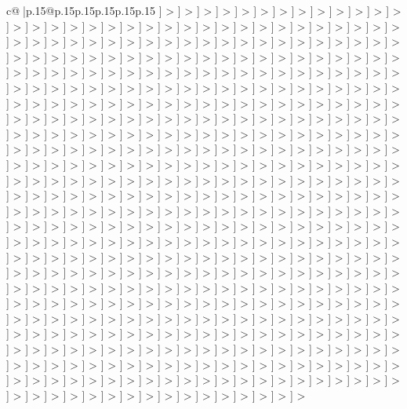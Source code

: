 \documentclass{article}
\begin{document}
{\begin{supertabular}{c@{$\;$}|p{.15\linewidth}@{}p{.15\linewidth}p{.15\linewidth}p{.15\linewidth}p{.15\linewidth}p{.15\linewidth}}
{{{{]} > {]} > {]} > {]} > {]} > {]} > {]} > {]} > {]} > {]} > {]} > {]} > {]} > {]} > {]} > {]} > {]} > {]} > {]} > {]} > {]} > {]} > {]} > {]} > {]} > {]} > {]} > {]} > {]} > {]} > {]} > {]} > {]} > {]} > {]} > {]} > {]} > {]} > {]} > {]} > {]} > {]} > {]} > {]} > {]} > {]} > {]} > {]} > {]} > {]} > {]} > {]} > {]} > {]} > {]} > {]} > {]} > {]} > {]} > {]} > {]} > {]} > {]} > {]} > {]} > {]} > {]} > {]} > {]} > {]} > {]} > {]} > {]} > {]} > {]} > {]} > {]} > {]} > {]} > {]} > {]} > {]} > {]} > {]} > {]} > {]} > {]} > {]} > {]} > {]} > {]} > {]} > {]} > {]} > {]} > {]} > {]} > {]} > {]} > {]} > {]} > {]} > {]} > {]} > {]} > {]} > {]} > {]} > {]} > {]} > {]} > {]} > {]} > {]} > {]} > {]} > {]} > {]} > {]} > {]} > {]} > {]} > {]} > {]} > {]} > {]} > {]} > {]} > {]} > {]} > {]} > {]} > {]} > {]} > {]} > {]} > {]} > {]} > {]} > {]} > {]} > {]} > {]} > {]} > {]} > {]} > {]} > {]} > {]} > {]} > {]} > {]} > {]} > {]} > {]} > {]} > {]} > {]} > {]} > {]} > {]} > {]} > {]} > {]} > {]} > {]} > {]} > {]} > {]} > {]} > {]} > {]} > {]} > {]} > {]} > {]} > {]} > {]} > {]} > {]} > {]} > {]} > {]} > {]} > {]} > {]} > {]} > {]} > {]} > {]} > {]} > {]} > {]} > {]} > {]} > {]} > {]} > {]} > {]} > {]} > {]} > {]} > {]} > {]} > {]} > {]} > {]} > {]} > {]} > {]} > {]} > {]} > {]} > {]} > {]} > {]} > {]} > {]} > {]} > {]} > {]} > {]} > {]} > {]} > {]} > {]} > {]} > {]} > {]} > {]} > {]} > {]} > {]} > {]} > {]} > {]} > {]} > {]} > {]} > {]} > {]} > {]} > {]} > {]} > {]} > {]} > {]} > {]} > {]} > {]} > {]} > {]} > {]} > {]} > {]} > {]} > {]} > {]} > {]} > {]} > {]} > {]} > {]} > {]} > {]} > {]} > {]} > {]} > {]} > {]} > {]} > {]} > {]} > {]} > {]} > {]} > {]} > {]} > {]} > {]} > {]} > {]} > {]} > {]} > {]} > {]} > {]} > {]} > {]} > {]} > {]} > {]} > {]} > {]} > {]} > {]} > {]} > {]} > {]} > {]} > {]} > {]} > {]} > {]} > {]} > {]} > {]} > {]} > {]} > {]} > {]} > {]} > {]} > {]} > {]} > {]} > {]} > {]} > {]} > {]} > {]} > {]} > {]} > {]} > {]} > {]} > {]} > {]} > {]} > {]} > {]} > {]} > {]} > {]} > {]} > {]} > {]} > {]} > {]} > {]} > {]} > {]} > {]} > {]} > {]} > {]} > {]} > {]} > {]} > {]} > {]} > {]} > {]} > {]} > {]} > {]} > {]} > {]} > {]} > {]} > {]} > {]} > {]} > {]} > {]} > {]} > {]} > {]} > {]} > {]} > {]} > {]} > {]} > {]} > {]} > {]} > {]} > {]} > {]} > {]} > {]} > {]} > {]} > {]} > {]} > {]} > {]} > {]} > {]} > {]} > {]} > {]} > {]} > {]} > {]} > {]} > {]} > {]} > {]} > {]} > {]} > {]} > {]} > {]} > {]} > {]} > {]} > {]} > {]} > {]} > {]} > {]} > {]} > {]} > {]} > {]} > {]} > {]} > {]} > {]} > {]} > {]} > {]} > {]} > {]} > {]} > {]} > {]} > {]} > {]} > {]} > {]} > {]} > {]} > {]} > {]} > {]} > {]} > {]} > {]} > {]} > {]} > {]} > {]} > {]} > {]} > {]} > {]} > {]} > {]} > {]} > {]} > {]} > {]} > {]} > {]} > {]} > {]} > {]} > {]} > {]} > {]} > {]} > {]} > {]} > {]} > {]} > {]} > {]} > {]} > {]} > {]} > {]} > {]} > {]} > {]} > {]} > {]} > {]} > {]} > {]} > {]} > {]} > {]} > {]} > {]} > {]} > {]} > {]} > {]} > {]} > {]} > {]} > {]} > {]} > {]} > {]} > {]} > {]} > {]} > {]} > {]} > {]} > {]} > {]} > {]} > {]} > {]} > {]} > {]} > {]} > {]} > {]} > {]} > {]} > {]} > {]} > {]} > {]} > {]} > {]} > {]} > {]} > {]} > {]} > {]} > {]} > {]} > {]} > {]} > {]} > {]} > {]} > }}}
\end{supertabular}}
\end{document}
